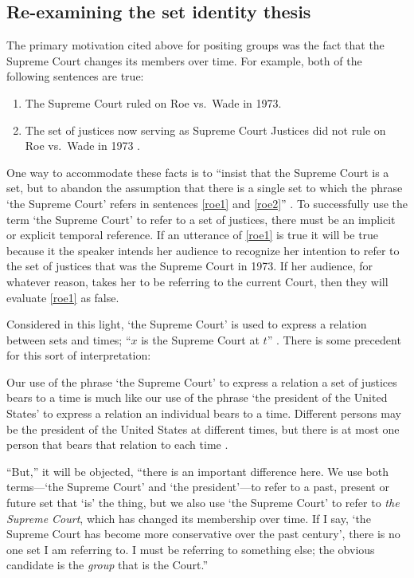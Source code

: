 \documentclass[11pt]{article}
\newenvironment{squote}{%
\begin{spacing}{1}
\begin{list}{}{%
\setlength{\labelwidth}{0pt}%
\rightmargin\leftmargin%
}
\item\relax
}{%
\end{list}%
\end{spacing}
}
\begin{document}
\begin{spacing}{1.5}
\subsection{Re-examining the set identity thesis}
\label{set-id}
The primary motivation cited above for positing groups was the fact
that the Supreme Court changes its members over time.  For example,
both of the following sentences are true:

\begin{enumerate}[label=(\arabic*)]
  \item The Supreme Court ruled on Roe vs.\ Wade in 1973. \label{roe1}

  \item The set of justices now serving as Supreme Court Justices did
    not rule on Roe vs.\ Wade in 1973
    \citep[135]{uzquiano2004a}. \label{roe2}
\end{enumerate}

One way to accommodate these facts is to ``insist that the Supreme
Court is a set, but to abandon the assumption that there is a single
set to which the phrase `the Supreme Court' refers in sentences
\ref{roe1} and \ref{roe2}'' \citep[138]{uzquiano2004a}.  To
successfully use the term `the Supreme Court' to refer to a set of
justices, there must be an implicit or explicit temporal reference.
If an utterance of \ref{roe1} is true it will be true because it the
speaker intends her audience to recognize her intention to refer to
the set of justices that was the Supreme Court in 1973.  If her
audience, for whatever reason, takes her to be referring to the
current Court, then they will evaluate \ref{roe1} as false.

Considered in this light, `the Supreme Court' is used to express a
relation between sets and times; ``$x$ is the Supreme Court at $t$''
\citep[140]{uzquiano2004a}.  There is some precedent for this sort of
interpretation:

\begin{squote}
Our use of the phrase `the Supreme Court' to express a relation a set
of justices bears to a time is much like our use of the phrase `the
president of the United States' to express a relation an individual
bears to a time.  Different persons may be the president of the United
States at different times, but there is at most one person that bears
that relation to each time \citep[138]{uzquiano2004a}.
\end{squote}

``But,'' it will be objected, ``there is an important difference here.
We use both terms---`the Supreme Court' and `the president'---to refer
to a past, present or future set that `is' the thing, but we also use
`the Supreme Court' to refer to {\em the Supreme Court}, which has
changed its membership over time.  If I say, `the Supreme Court has
become more conservative over the past century', there is no one set I
am referring to.  I must be referring to something else; the obvious
candidate is the {\em group} that is the Court.''


\end{spacing}
\end{document}
